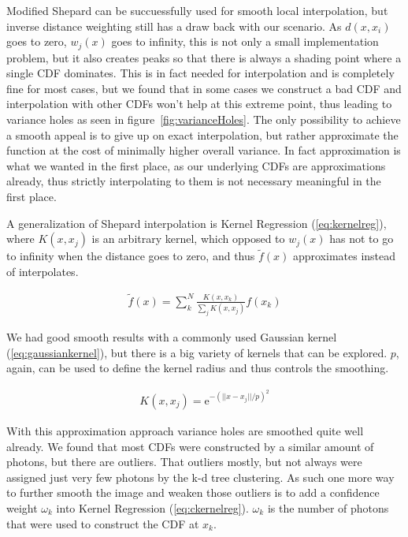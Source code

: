 Modified Shepard can be succuessfully used for smooth local interpolation, but inverse distance weighting still has a draw back with our scenario. As $d(x, x_i)$ goes to zero, $w_j(x)$ goes to infinity, this is not only a small implementation problem, but it also creates peaks so that there is always a shading point where a single CDF dominates. This is in fact needed for interpolation and is completely fine for most cases, but we found that in some cases we construct a bad CDF and interpolation with other CDFs won't help at this extreme point, thus leading to variance holes as seen in figure~\ref{fig:varianceHoles}. The only possibility to achieve a smooth appeal is to give up on exact interpolation, but rather approximate the function at the cost of minimally higher overall variance. In fact approximation is what we wanted in the first place, as our underlying CDFs are approximations already, thus strictly interpolating to them is not necessary meaningful in the first place.

A generalization of Shepard interpolation is Kernel Regression (\ref{eq:kernelreg}), where $K(x, x_j)$ is an arbitrary kernel, which opposed to $w_j(x)$ has not to go to infinity when the distance goes to zero, and thus $\widetilde{f}(x)$ approximates instead of interpolates. 

\begin{align}\label{eq:kernelreg}
\widetilde{f}(x) = \sum_{k}^{N}\frac{K(x,x_k)}{\sum\nolimits_{j}K(x, x_j)}f(x_k)
\end{align}

We had good smooth results with a commonly used Gaussian kernel (\ref{eq:gaussiankernel}), but there is a big variety of kernels that can be explored. $p$, again, can be used to define the kernel radius and thus controls the smoothing.

\begin{align}\label{eq:gausskernel}
K(x, x_j) = \mathrm{e}^{-(||x-x_j||/p)^2}
\end{align}

With this approximation approach variance holes are smoothed quite well already. We found that most CDFs were constructed by a similar amount of photons, but there are outliers. That outliers mostly, but not always were assigned just very few photons by the k-d tree clustering. As such one more way to further smooth the image and weaken those outliers is to add a confidence weight $\omega_k$ into Kernel Regression (\ref{eq:ckernelreg}). $\omega_k$ is the number of photons that were used to construct the CDF at $x_k$.

